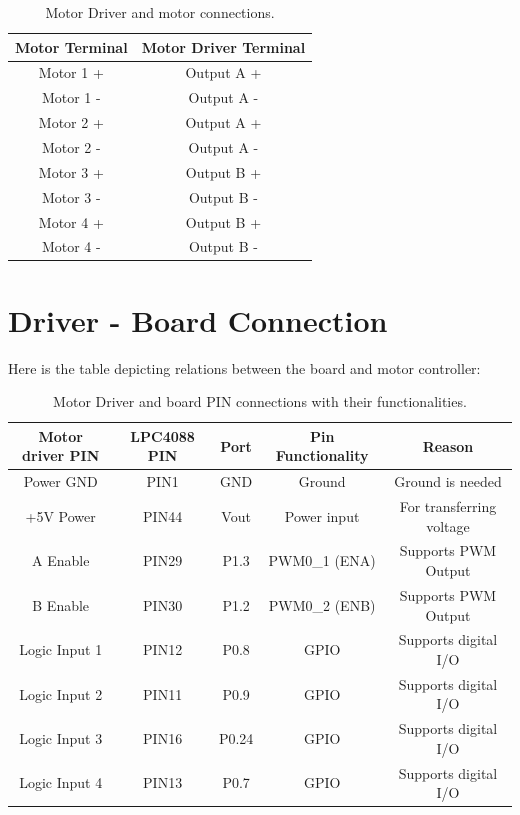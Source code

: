 \documentclass[12pt]{article}
\begin{document}
\begin {table}[H]
\begin{center}
\begin{tabular}{|c|c|}
\hline
Motor Terminal & Motor Driver Terminal \\\hline
Motor 1 + & Output A + \\\hline
Motor 1 - & Output A - \\\hline
Motor 2 + & Output A + \\\hline
Motor 2 - & Output A - \\\hline
Motor 3 + & Output B + \\\hline
Motor 3 - & Output B - \\\hline
Motor 4 + & Output B + \\\hline
Motor 4 - & Output B - \\\hline
\end{tabular}
\caption{Motor Driver and motor connections.}
\end{center}
\end{table}


\newpage
\section{Driver - Board Connection}

Here is the table depicting relations between the board and motor controller:

\begin {table}[H]
\begin{center}
\begin{tabular}{|c|c|c|c|c|}
\hline
Motor driver PIN & LPC4088 PIN & Port & Pin Functionality & Reason \\\hline
Power GND & PIN1 & GND & Ground & Ground is needed \\\hline
+5V Power & PIN44 & Vout & Power input & For transferring voltage \\\hline
A Enable & PIN29 & P1.3 & PWM0\_1 (ENA) & Supports PWM Output \\\hline
B Enable & PIN30 & P1.2 & PWM0\_2 (ENB) & Supports PWM Output \\\hline
Logic Input 1 & PIN12 & P0.8 & GPIO & Supports digital I/O \\\hline
Logic Input 2 & PIN11 & P0.9 & GPIO & Supports digital I/O \\\hline
Logic Input 3 & PIN16 & P0.24 & GPIO & Supports digital I/O \\\hline
Logic Input 4 & PIN13 & P0.7 & GPIO & Supports digital I/O \\\hline
\end{tabular}
\caption{Motor Driver and board PIN connections with their functionalities.}
\end{center}
\end{table}
\end{document}
